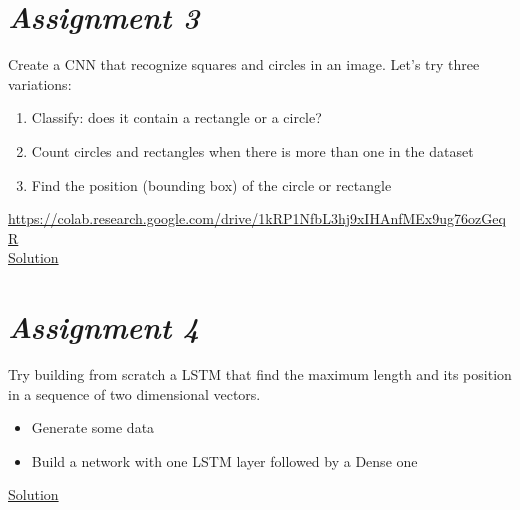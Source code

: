 \section{\textit{Assignment 3}}

Create a CNN that recognize squares and circles in an image. Let’s try three variations:

\begin{enumerate}
	\item Classify: does it contain a rectangle or a circle?
	\item Count circles and rectangles when there is more than one in the dataset
	\item Find the position (bounding box) of the circle or rectangle
\end{enumerate}

\url{https://colab.research.google.com/drive/1kRP1NfbL3hj9xIHAnfMEx9ug76ozGeqR}\\

\href{https://colab.research.google.com/drive/1KHjAsly12wQnrENOgJhF1XKnRFAGmAA6#scrollTo=YiUPPdZ6pNsi}{Solution}


\section{\textit{Assignment 4}}


Try building from scratch a LSTM that find the maximum length and its position in a sequence of two dimensional vectors.\\

\begin{itemize}
	\item Generate some data
	\item Build a network with one LSTM layer followed by a Dense one
\end{itemize}


\href{https://colab.research.google.com/drive/1AyK6r9VG7rV0ZDjqDXu1q0ROEfAAwlU7?usp=sharing}{Solution}